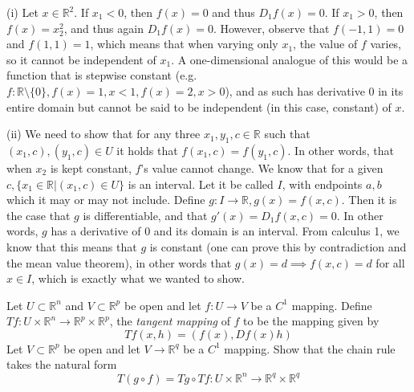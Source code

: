 \begin{solution}

    (i) Let $x \in \mathbb{R}^2$.
    If $x_1 < 0$, then $f(x) = 0$ and thus $D_1 f(x) = 0$.
    If $x_1 > 0$, then $f(x) = x_2^2$, and thus again $D_1 f(x) = 0$.
    However, observe that $f(-1, 1) = 0$ and $f(1, 1) = 1$, which means that when varying only $x_1$, the value of $f$ varies, so it cannot be independent of $x_1$. A one-dimensional analogue of this would be a function that is stepwise constant (e.g. $f :\mathbb{R} \setminus \{0\}, f(x) = 1, x < 1, f(x) = 2, x > 0$), and as such has derivative 0 in its entire domain but cannot be said to be independent (in this case, constant) of $x$.

    (ii) We need to show that for any three $x_1, y_1, c \in \mathbb{R}$ such that $(x_1, c), (y_1, c) \in U$ it holds that $f(x_1, c) = f(y_1, c)$. 
    In other words, that when $x_2$ is kept constant, $f$'s value cannot change.
    We know that for a given $c, \{x_1 \in \mathbb{R} \lvert (x_1, c) \in U\}$ is an interval.
    Let it be called $I$, with endpoints $a, b$ which it may or may not include.
    Define $g: I \rightarrow \mathbb{R}, g(x) = f(x, c)$. 
    Then it is the case that $g$ is differentiable, and that $g'(x) = D_1 f(x, c) = 0$.
    In other words, $g$ has a derivative of 0 and its domain is an interval.
    From calculus 1, we know that this means that $g$ is constant (one can prove this by contradiction and the mean value theorem), in other words that $g(x) = d \implies f(x, c) = d$ for all $x \in I$, which is exactly what we wanted to show.
\end{solution}

\begin{exercise}{22}
    Let $U \subset \mathbb{R}^n$ and $V \subset \mathbb{R}^p$ be open and let $f: U \rightarrow V$ be a $C^1$ mapping.
    Define $T f : U \times \mathbb{R}^n \rightarrow \mathbb{R}^p \times \mathbb{R}^p$, the \textit{tangent mapping } of $f$ to be the mapping given by
    $$T f(x, h) = (f(x), Df(x) h)$$
    Let $V \subset \mathbb{R}^p$ be open and let $V \rightarrow \mathbb{R}^q$ be a $C^1$ mapping.
    Show that the chain rule takes the natural form
    $$T(g \circ f) = Tg \circ T f: U \times \mathbb{R}^n \rightarrow \mathbb{R}^q \times \mathbb{R}^q$$
\end{exercise}

